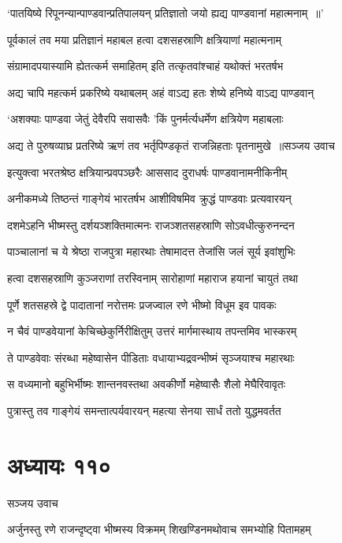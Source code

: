 \twolineshloka
{`पातयिष्ये रिपूनन्यान्पाण्डवान्प्रतिपालयन्}
{प्रतिज्ञातो जयो ह्यद्य पाण्डवानां महात्मनाम् ॥'}


\twolineshloka
{पूर्वकालं तव मया प्रतिज्ञानं महाबल}
{हत्वा दशसहस्राणि क्षत्रियाणां महात्मनाम्}


\twolineshloka
{संग्रामादपयास्यामि ह्येतत्कर्म समाहितम्}
{इति तत्कृतवांश्चाहं यथोक्तं भरतर्षभ}


\twolineshloka
{अद्य चापि महत्कर्म प्रकरिष्ये यथाबलम्}
{अहं वाऽद्य हतः शेष्ये हनिष्ये वाऽद्य पाण्डवान्}


\twolineshloka
{`अशक्याः पाण्डवा जेतुं देवैरपि सवासवैः}
{'किं पुनर्मर्त्यधर्मेण क्षत्रियेण महाबलाः}


\threelineshloka
{अद्य ते पुरुषव्याघ्र प्रतरिष्ये ऋणं तव}
{भर्तृपिण्डकृतं राजन्निहताः पृतनामुखे ॥सञ्जय उवाच}
{}


\twolineshloka
{इत्युक्त्वा भरतश्रेष्ठ क्षत्रियान्प्रवपञ्छरैः}
{आससाद दुराधर्षः पाण्डवानामनीकिनीम्}


\twolineshloka
{अनीकमध्ये तिष्ठन्तं गाङ्गेयं भारतर्षभ}
{आशीविषमिव क्रुद्धं पाण्डवाः प्रत्यवारयन्}


\twolineshloka
{दशमेऽहनि भीष्मस्तु दर्शयञ्शक्तिमात्मनः}
{राजञ्शतसहस्राणि सोऽवधीत्कुरुनन्दन}


\twolineshloka
{पाञ्चालानां च ये श्रेष्ठा राजपुत्रा महारथाः}
{तेषामादत्त तेजांसि जलं सूर्य इवांशुभिः}


\twolineshloka
{हत्वा दशसहस्राणि कुञ्जराणां तरस्विनाम्}
{सारोहाणां महाराज हयानां चायुतं तथा}


\twolineshloka
{पूर्णे शतसहस्रे द्वे पादातानां नरोत्तमः}
{प्रजज्वाल रणे भीष्मो विधूम इव पावकः}


\twolineshloka
{न चैवं पाण्डवेयानां केचिच्छेकुर्निरीक्षितुम्}
{उत्तरं मार्गमास्थाय तपन्तमिव भास्करम्}


\twolineshloka
{ते पाण्डवेवाः संरब्धा महेष्वासेन पीडिताः}
{वधायाभ्यद्रवन्भीष्मं सृञ्जयाश्च महारथाः}


\twolineshloka
{स वध्यमानो बहुभिर्भीष्मः शान्तनवस्तथा}
{अवकीर्णो महेष्वासैः शैलो मेघैरिवावृतः}


\twolineshloka
{पुत्रास्तु तव गाङ्गेयं समन्तात्पर्यवारयन्}
{महत्या सेनया सार्धं ततो युद्धमवर्तत}


\chapter{अध्यायः ११०}
\twolineshloka
{सञ्जय उवाच}
{}


\twolineshloka
{अर्जुनस्तु रणे राजन्दृष्ट्वा भीष्मस्य विक्रमम्}
{शिखण्डिनमथोवाच समभ्योहि पितामहम्}


